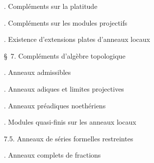 \noindent{}. Compléments sur la platitude\dotfill

\noindent{}. Compléments sur les modules projectifs\dotfill

\noindent{}. Existence d'extensions plates d'anneaux locaux\dotfill

\noindent\quad {}

\noindent\quad \S\ 7. Compléments d'algèbre topologique\dotfill

\noindent{}. Anneaux admissibles\dotfill

\noindent{}. Anneaux adiques et limites projectives\dotfill

\noindent{}. Anneaux préadiques noethériens\dotfill

\noindent{}. Modules quasi-finis sur les anneaux locaux\dotfill

\noindent\qquad {} 7.5. Anneaux de séries formelles restreintes\dotfill

\noindent{}. Anneaux complets de fractions\dotfill

